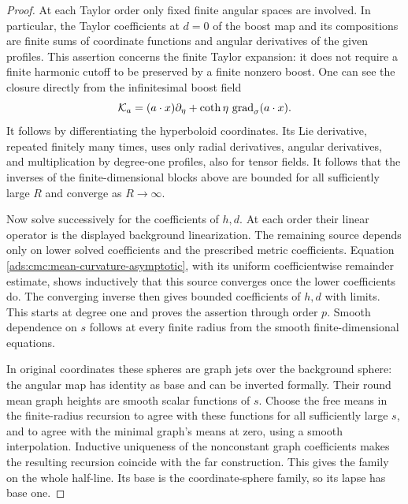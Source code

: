 \begin{proof}
At each Taylor order only fixed finite angular spaces are involved.
In particular, the Taylor coefficients at \(d=0\) of the boost map
and its compositions are finite sums of coordinate functions and
angular derivatives of the given profiles.  This assertion concerns
the finite Taylor expansion: it does not require a finite harmonic
cutoff to be preserved by a finite nonzero boost.
One can see the closure directly from the infinitesimal boost field
\[
 \mathcal K_a=(a\cdot x)\partial_\eta
               +\coth\eta\,\operatorname{grad}_\sigma(a\cdot x).
\]
It follows by differentiating the hyperboloid coordinates.
Its Lie derivative, repeated finitely many times, uses only radial
derivatives, angular derivatives, and multiplication by degree-one
profiles, also for tensor fields.
It follows that the inverses of the finite-dimensional blocks above
are bounded for all sufficiently large \(R\) and converge as
\(R\to\infty\).

Now solve successively for the coefficients of \(h,d\).
At each order their linear operator is the displayed background
linearization.  The remaining source depends only on lower solved
coefficients and the prescribed metric coefficients.
Equation \eqref{ads:cmc:mean-curvature-asymptotic}, with its uniform
coefficientwise remainder estimate, shows inductively that this
source converges once the lower coefficients do.
The converging inverse then gives bounded coefficients of \(h,d\)
with limits.  This starts at degree one and proves the assertion
through order \(p\).
Smooth dependence on \(s\) follows at every finite radius from the
smooth finite-dimensional equations.

In original coordinates these spheres are graph jets over the
background sphere: the angular map has identity as base and can be
inverted formally.  Their round mean graph heights are smooth scalar
functions of \(s\).  Choose the free means in the finite-radius
recursion to agree with these functions for all sufficiently large
\(s\), and to agree with the minimal graph's means at zero, using a
smooth interpolation.  Inductive uniqueness of the nonconstant
graph coefficients makes the resulting recursion coincide with the
far construction.  This gives the family on the whole half-line.
Its base is the coordinate-sphere family, so its lapse has base one.


\end{proof}
